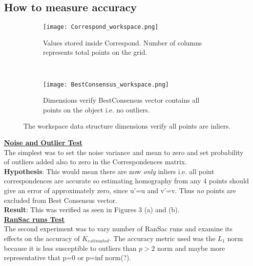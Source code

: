 \documentclass[titlepage]{article}
\begin{document}
\subsection{How to measure accuracy}
\label{Accuracy}
%
\begin{figure}[H]
\begin{center}
\begin{subfigure}{0.5\textwidth}
\label{Correspond}
\texttt{[image: Correspond\_workspace.png]}
\caption{Values stored inside Correspond. Number of columns represents total points on the grid.}
\end{subfigure}\\
\begin{subfigure}{0.5\textwidth}
\label{Consensus}
\texttt{[image: BestConsensus\_workspace.png]}
\caption{Dimensions verify BestConsensus vector contains all points on the object i.e. no outliers.}
\end{subfigure}
\caption{The workspace data structure dimensions verify all points are inliers.}
\end{center}
\end{figure}
\textbf{\underline{Noise and Outlier Test}}\\
The simplest was to set the noise variance and mean to zero and set probability of outliers added also to zero in the Correspondences matrix.\\
\vspace{2mm}
\textbf{Hypothesis}: This would mean there are now \textit{only} inliers i.e. all point correspondences are accurate so estimating homography from any 4 points should give an error of approximately zero, since u’=u and v’=v. Thus \textit{no} points are excluded from Best Consensus vector. \\
\vspace{2mm}
\textbf{Result}: This was verified as seen in Figures 3 (a) and (b).\\
\textbf{\underline{RanSac runs Test}}\\
The second experiment was to vary number of RanSac runs and examine its effects on the accuracy of $K_{estimated}$. The accuracy metric used was the $L_{1}$ norm because it is less susceptible to outliers than $p > 2$ norm and maybe more representative that p=0 or p=inf norm(?).\\
\end{document}
